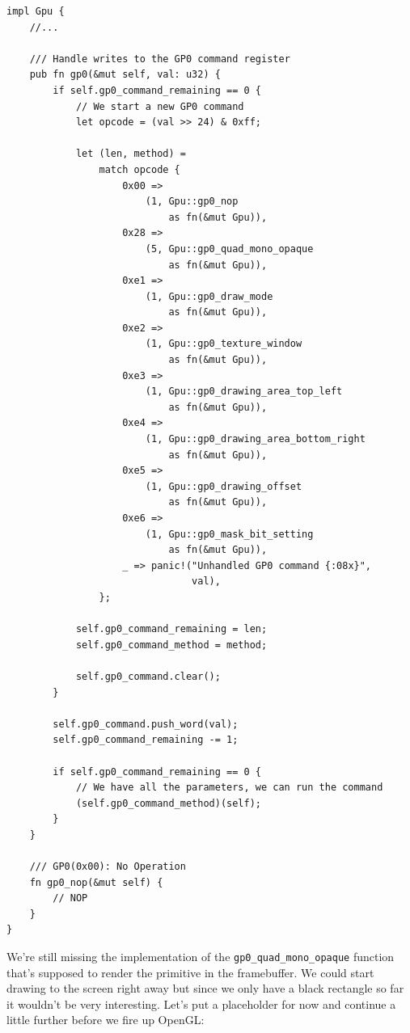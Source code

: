 \documentclass[a4paper]{article}
\newcommand{\code}[1] {\texttt{#1}}
\begin{document}
\begin{lstlisting}
impl Gpu {
    //...

    /// Handle writes to the GP0 command register
    pub fn gp0(&mut self, val: u32) {
        if self.gp0_command_remaining == 0 {
            // We start a new GP0 command
            let opcode = (val >> 24) & 0xff;

            let (len, method) =
                match opcode {
                    0x00 =>
                        (1, Gpu::gp0_nop
                            as fn(&mut Gpu)),
                    0x28 =>
                        (5, Gpu::gp0_quad_mono_opaque
                            as fn(&mut Gpu)),
                    0xe1 =>
                        (1, Gpu::gp0_draw_mode
                            as fn(&mut Gpu)),
                    0xe2 =>
                        (1, Gpu::gp0_texture_window
                            as fn(&mut Gpu)),
                    0xe3 =>
                        (1, Gpu::gp0_drawing_area_top_left
                            as fn(&mut Gpu)),
                    0xe4 =>
                        (1, Gpu::gp0_drawing_area_bottom_right
                            as fn(&mut Gpu)),
                    0xe5 =>
                        (1, Gpu::gp0_drawing_offset
                            as fn(&mut Gpu)),
                    0xe6 =>
                        (1, Gpu::gp0_mask_bit_setting
                            as fn(&mut Gpu)),
                    _ => panic!("Unhandled GP0 command {:08x}",
                                val),
                };

            self.gp0_command_remaining = len;
            self.gp0_command_method = method;

            self.gp0_command.clear();
        }

        self.gp0_command.push_word(val);
        self.gp0_command_remaining -= 1;

        if self.gp0_command_remaining == 0 {
            // We have all the parameters, we can run the command
            (self.gp0_command_method)(self);
        }
    }

    /// GP0(0x00): No Operation
    fn gp0_nop(&mut self) {
        // NOP
    }
}
\end{lstlisting}

We're still missing the implementation of the
\code{gp0\_quad\_mono\_opaque} function that's supposed to render the
primitive in the framebuffer. We could start drawing to the screen
right away but since we only have a black rectangle so far it wouldn't
be very interesting. Let's put a placeholder for now and continue a
little further before we fire up OpenGL:
\end{document}
